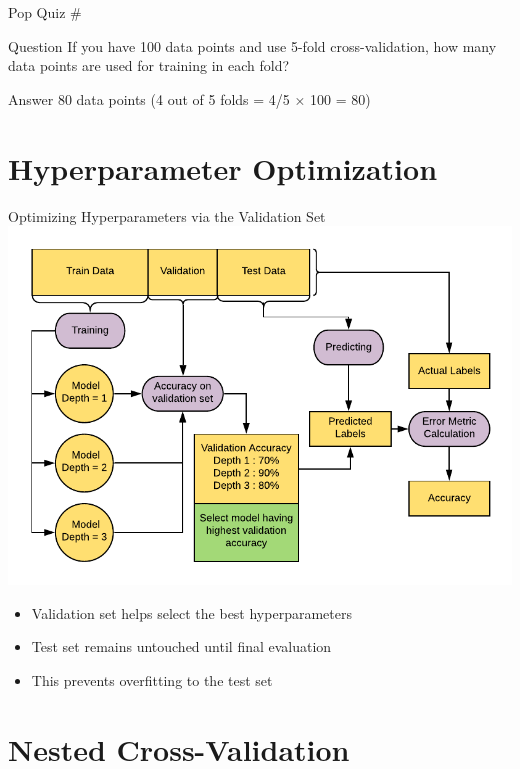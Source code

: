 \documentclass[usenames,dvipsnames]{beamer}
\newcounter{popquiz}
\begin{document}
\begin{frame}{Pop Quiz \#\thepopquiz}
\begin{block}{Question}
If you have 100 data points and use 5-fold cross-validation, how many data points are used for training in each fold?
\end{block}
\pause
\begin{block}{Answer}
80 data points (4 out of 5 folds = 4/5 × 100 = 80)
\end{block}
\end{frame}

\section{Hyperparameter Optimization}

\begin{frame}{Optimizing Hyperparameters via the Validation Set}
\includegraphics[width = \textwidth]{../assets/cross-validation/diagrams/validation-workflow}
\begin{itemize}
	\item \pause Validation set helps select the best hyperparameters
	\item \pause Test set remains untouched until final evaluation
	\item \pause This prevents overfitting to the test set
\end{itemize}
\end{frame}

\section{Nested Cross-Validation}
\end{document}
